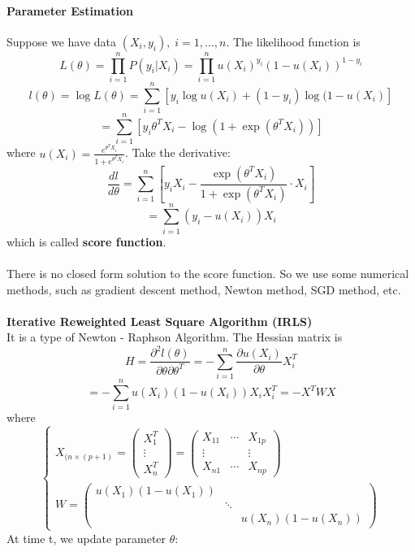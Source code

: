\documentclass[12pt]{book}
\theoremstyle{definition}
\theoremstyle{remark}
\begin{document}
\paragraph{Parameter Estimation}
Suppose we have data $(X_i,y_i),\;i = 1,\dots,n$. The likelihood function is 
\[L(\theta) = \prod_{i=1}^nP(y_i|X_i) = \prod_{i=1}^n u(X_i)^{y_i}(1-u(X_i))^{1-y_i}\]
\[l(\theta) = \log L(\theta) = \sum_{i=1}^n [y_i\log u(X_i)+(1-y_i)\log (1-u(X_i)]\]
\[ = \sum_{i=1}^n [y_i \theta^TX_i - \log (1+\exp (\theta^TX_i))]\]
where $u(X_i) = \frac{e^{\theta^TX_i}}{1+e^{\theta^TX_i}}$.
Take the derivative:\\
\[\frac{dl}{d\theta} = \sum_{i=1}^n[y_iX_i - \frac{\exp(\theta^TX_i)}{1+\exp(\theta^TX_i)}\cdot X_i]\]
\[ = \sum_{i=1}^n(y_i - u(X_i))X_i\]
which is called \textbf{score function}. \\
\\
There is no closed form solution to the score function. So we use some numerical methods, such as gradient descent method, Newton method, SGD method, etc.\\
\\
\textbf{Iterative Reweighted Least Square Algorithm (IRLS)}\\
It is a type of Newton - Raphson Algorithm. The Hessian matrix is
\[H = \frac{\partial^2 l(\theta)}{\partial \theta\partial \theta^T} = -\sum_{i=1}^n \frac{\partial u(X_i)}{\partial \theta}X_i^T\]
\[ = -\sum_{i=1}^n u(X_i)(1-u(X_i))X_iX_i^T = -X^TWX\]
where \[\begin{cases}X_{(n\times (p+1)} = \begin{pmatrix}X_1^T
 \\\vdots
 \\X_n^T
\end{pmatrix} = \begin{pmatrix}
 X_{11} & \cdots & X_{1p}\\
 \vdots &  & \vdots\\
 X_{n1} & \cdots & X_{np}
\end{pmatrix}
 \\
W = \begin{pmatrix}
 u(X_1)(1-u(X_1)) &   & \\
  & \ddots  & \\
  &   &u(X_n)(1-u(X_n))
\end{pmatrix}
\end{cases}\]
At time t, we update parameter $\theta$:\\
\end{document}
